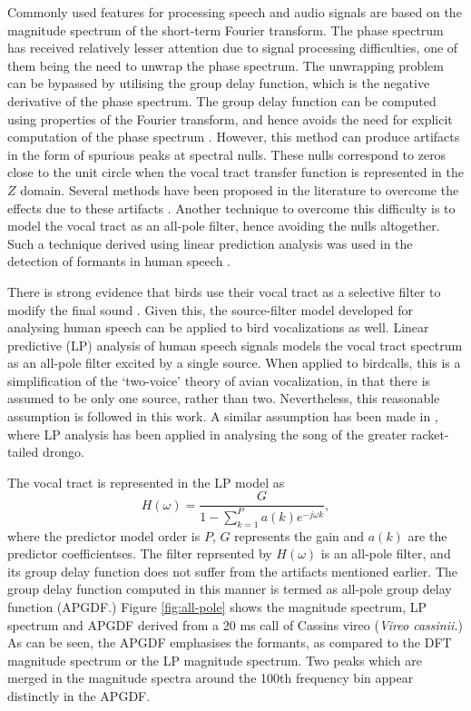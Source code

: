 \documentclass[a4paper]{article}
\begin{document}
Commonly used features for processing speech and audio signals are based on the
magnitude spectrum of the short-term Fourier transform. The phase spectrum has
received relatively lesser attention due to signal processing difficulties, one
of them being the need to unwrap the phase spectrum. The unwrapping problem can be
bypassed by utilising the group delay function, which is the negative derivative
of the phase spectrum. The group delay function can be
computed using properties of the Fourier transform, and hence avoids the need
for explicit computation of the phase spectrum \cite{gdDeriv}. 
However, this method can produce
artifacts in the form of spurious peaks at spectral nulls. These nulls
correspond to zeros close to the unit circle when the vocal tract transfer
function is represented in the $Z$ domain. 
Several methods have been proposed in the literature to overcome the effects due
to these artifacts \cite{modgdf, productSpectrum}. Another technique to overcome
this difficulty is to model the vocal tract as an all-pole filter, hence
avoiding the nulls altogether. Such a
technique derived using linear prediction analysis was used in the detection of
formants in human speech \cite{yegnaFormant}. 


There is strong evidence that birds use their vocal tract as a selective filter
to modify the final sound \cite{catchpole}.  Given this, the source-filter model
developed for analysing human speech can be applied to bird vocalizations as
well.  Linear predictive (LP) analysis of human speech signals models the vocal
tract spectrum as an all-pole filter \cite{makhoul} excited by a single source.
When applied to birdcalls, this is a simplification of the `two-voice' theory of
avian vocalization\cite{catchpole}, in that there is assumed to be only one
source, rather than two. Nevertheless, this reasonable assumption is followed in
this work. A similar assumption has been made in \cite{agnihotri}, where LP
analysis has been applied in analysing the song of the greater racket-tailed
drongo.

The vocal tract is represented in the LP model as
\begin{equation}
H(\omega) = \frac{G}{1-\sum_{k=1}^{P} a(k) e^{-j \omega k}},
\end{equation}
where the predictor model order is $P$, $G$ represents the gain and $a(k)$ are
the predictor coefficientses\cite{makhoul}.
The filter reprsented by $H(\omega)$ is an all-pole filter, and its group delay
function does not suffer from the artifacts mentioned earlier. The group delay
function computed in this manner is termed as all-pole group delay
function (APGDF.) Figure \ref{fig:all-pole} shows the magnitude spectrum, LP
spectrum and APGDF derived from a 20 ms call of Cassins vireo (\textit{Vireo
cassinii.}) As can be seen, the APGDF emphasises the formants, as compared to the
DFT magnitude spectrum or the LP magnitude spectrum. Two peaks which are merged
in the magnitude spectra around the 100th frequency bin appear distinctly in the
APGDF.
\end{document}
